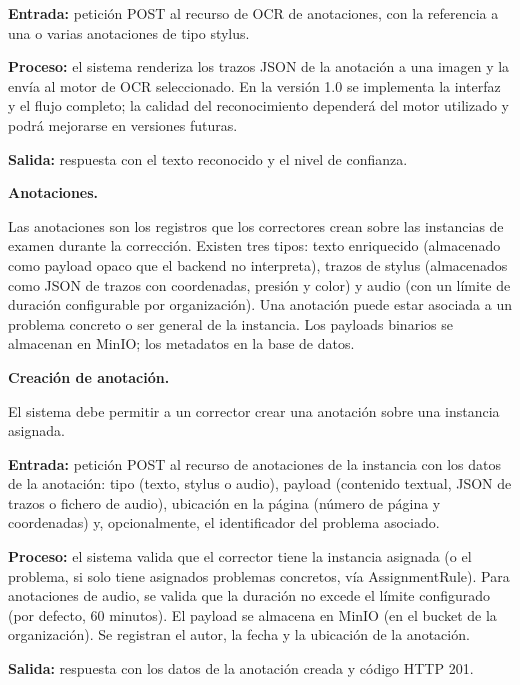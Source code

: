 \begin{functional}
\begin{functional}
    \textbf{Entrada:} petición POST al recurso de OCR de anotaciones, con la referencia a una o varias anotaciones de tipo stylus.

    \textbf{Proceso:} el sistema renderiza los trazos JSON de la anotación a una imagen y la envía al motor de OCR seleccionado. En la versión 1.0 se implementa la interfaz y el flujo completo; la calidad del reconocimiento dependerá del motor utilizado y podrá mejorarse en versiones futuras.

    \textbf{Salida:} respuesta con el texto reconocido y el nivel de confianza.

  \end{functional}

  \item \textbf{Anotaciones.}

  Las anotaciones son los registros que los correctores crean sobre las instancias de examen durante la corrección. Existen tres tipos: texto enriquecido (almacenado como payload opaco que el backend no interpreta), trazos de stylus (almacenados como JSON de trazos con coordenadas, presión y color) y audio (con un límite de duración configurable por organización). Una anotación puede estar asociada a un problema concreto o ser general de la instancia. Los payloads binarios se almacenan en MinIO; los metadatos en la base de datos.

  \begin{functional}
    \item \textbf{Creación de anotación.}

    El sistema debe permitir a un corrector crear una anotación sobre una instancia asignada.

    \textbf{Entrada:} petición POST al recurso de anotaciones de la instancia con los datos de la anotación: tipo (texto, stylus o audio), payload (contenido textual, JSON de trazos o fichero de audio), ubicación en la página (número de página y coordenadas) y, opcionalmente, el identificador del problema asociado.

    \textbf{Proceso:} el sistema valida que el corrector tiene la instancia asignada (o el problema, si solo tiene asignados problemas concretos, vía AssignmentRule). Para anotaciones de audio, se valida que la duración no excede el límite configurado (por defecto, 60 minutos). El payload se almacena en MinIO (en el bucket de la organización). Se registran el autor, la fecha y la ubicación de la anotación.

    \textbf{Salida:} respuesta con los datos de la anotación creada y código HTTP 201.


\end{functional}
\end{functional}
